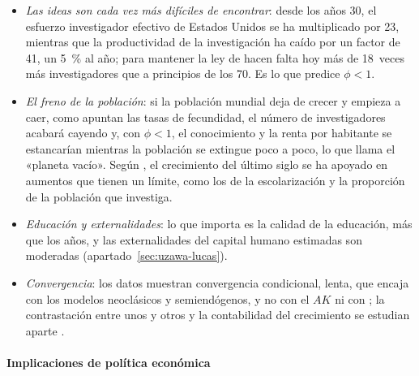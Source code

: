 \documentclass[11pt]{article}
\begin{document}
\begin{itemize}
\item \emph{Las ideas son cada vez más difíciles de encontrar}: desde los años 30, el esfuerzo investigador efectivo de Estados Unidos se ha multiplicado por 23, mientras que la productividad de la investigación ha caído por un factor de 41, un 5~\% al año; para mantener la ley de  hacen falta hoy más de 18~veces más investigadores que a principios de los 70\nocite{BloomEtAl2020}. Es lo que predice $\phi<1$.
\item \emph{El freno de la población}: si la población mundial deja de crecer y empieza a caer, como apuntan las tasas de fecundidad, el número de investigadores acabará cayendo y, con $\phi<1$, el conocimiento y la renta por habitante se estancarían mientras la población se extingue poco a poco, lo que  llama el «planeta vacío»\nocite{Jones2022End}. Según \textcite{Jones2023}, el crecimiento del último siglo se ha apoyado en aumentos que tienen un límite, como los de la escolarización y la proporción de la población que investiga.
\item \emph{Educación y externalidades}: lo que importa es la calidad de la educación, más que los años, y las externalidades del capital humano estimadas son moderadas (apartado~\ref{sec:uzawa-lucas}).
\item \emph{Convergencia}: los datos muestran convergencia condicional, lenta, que encaja con los modelos neoclásicos y semiendógenos, y no con el $AK$ ni con ; la contrastación entre unos y otros y la contabilidad del crecimiento se estudian aparte .
\end{itemize}

\paragraph{Implicaciones de política económica}
\end{document}

